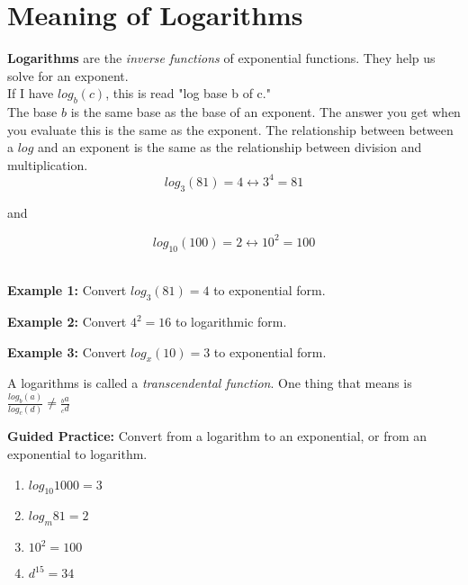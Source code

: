 \documentclass[12pt]{article}
\begin{document}
\section{Meaning of Logarithms}

\textbf{Logarithms} are the \textit{inverse functions} of exponential functions. They help us solve for an exponent.\\

If I have $log_{b}(c)$, this is read "log base b of c."\\

The base $b$ is the same base as the base of an exponent. The answer you get when you evaluate this is the same as the exponent. The relationship between between a $log$ and an exponent is the same as the relationship between division and multiplication.\\

$$log_{3}(81)=4 \longleftrightarrow 3^4=81$$

and

$$log_{10}(100)=2 \longleftrightarrow 10^2=100$$\\

\hrulefill

\textbf{Example 1:} Convert $log_{3}(81)=4$ to exponential form.\\

\vspace{1cm}

\textbf{Example 2:} Convert $4^2=16$ to logarithmic form.\\

\vspace{1cm}

\textbf{Example 3:} Convert $log_{x}(10)=3$ to exponential form.\\

\vspace{1cm}

A logarithms is called a \textit{transcendental function}. One thing that means is $\frac{log_{b}(a)}{log_{c}(d)} \neq \frac{_ba}{_cd}$\\

\hrulefill

\textbf{Guided Practice:} Convert from a logarithm to an exponential, or from an exponential to logarithm.\\

\begin{multicols}{2}
\begin{enumerate}
	\setlength\itemsep{1cm}
	
	\item $log_{10}1000=3$\\
	
	\item $log_m{81}=2$\\
	
	\item $10^{2}=100$\\
	
	\item $d^{15}=34$\\

\end{enumerate}
\end{multicols}
\end{document}
